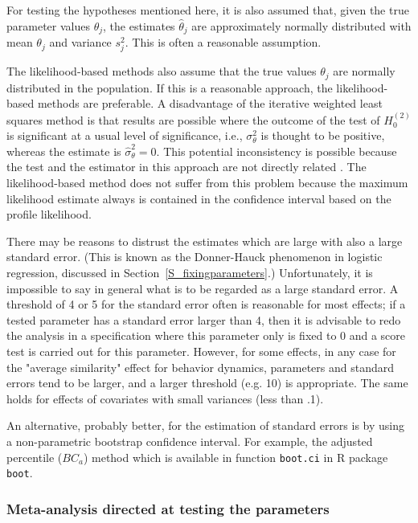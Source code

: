 \documentclass[a4paper,fleqn,11pt]{article}
\newcommand{\+}{\, + \,}
\newcommand{\R}{{\sf R }}
\begin{document}
For testing the hypotheses mentioned here, it is also assumed that,
given the true parameter values $\theta_j$, the
estimates $\hat{\theta}_j$ are approximately normally distributed
with mean $\theta_j$ and variance $s^2_j$.
This is often a reasonable assumption.

The likelihood-based methods also assume that the true values
$\theta_j$ are normally distributed in the population.
If this is a reasonable approach, the likelihood-based methods
are preferable.
A disadvantage of the iterative weighted least squares method
is that results are possible
where the outcome of the test of $H_0^{(2)}$ is significant
at a usual level of significance,
i.e., $\sigma^2_\theta$ is thought to be positive, whereas
the estimate is $\hat\sigma^2_\theta = 0$.
This  potential inconsistency is possible because the test
and the estimator in this approach are not directly related
\citep[cf.][]{SnijdersBaerveldt03}.
The likelihood-based method does not suffer from this problem
because the maximum likelihood estimate always is contained
in the confidence interval based on the profile likelihood.
\bigskip

There may be reasons to distrust the estimates which are
large with also a large standard error. (This is known as the Donner-Hauck
phenomenon in logistic regression, discussed in
Section~\ref{S_fixingparameters}.)
Unfortunately, it is impossible to say in
general what is to be regarded as a large standard error.
A threshold of 4 or 5 for the standard error often is reasonable
for most effects; if a tested
parameter has a standard error larger than 4, then it is advisable to redo
the analysis in a specification where this parameter only is fixed to 0 and a
score test is carried out for this parameter. However, for some effects, in
any case for the "average similarity" effect for behavior dynamics,
parameters and standard errors tend to be larger, and a larger threshold
(e.g. 10) is appropriate. The same holds for effects of covariates with small
variances (less than .1).

An alternative, probably better, for the estimation of standard errors
is by using a non-parametric bootstrap confidence interval. For example, the
adjusted percentile ($BC_a$) method
\citep[][Chapter 5]{Efron1987,DavisonHinkley1997}
which is available in function \texttt{boot.ci} in \R package \texttt{boot}.


\subsubsection{Meta-analysis directed at testing the parameters}
\end{document}
